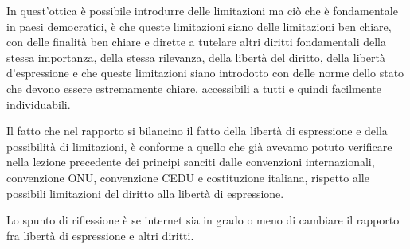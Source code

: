 In quest'ottica è possibile introdurre delle limitazioni ma ciò che è fondamentale in paesi democratici, è che queste limitazioni siano delle limitazioni ben chiare, con delle finalità ben chiare e dirette a tutelare altri diritti fondamentali della stessa importanza, della stessa rilevanza, della libertà del diritto, della libertà d'espressione e che queste limitazioni siano introdotto con delle norme dello stato che devono essere estremamente chiare, accessibili a tutti e quindi facilmente individuabili.\par
Il fatto che nel rapporto si bilancino il fatto della libertà di espressione e della possibilità di limitazioni, è conforme a quello che già avevamo potuto verificare nella lezione precedente dei principi sanciti dalle convenzioni internazionali, convenzione ONU, convenzione CEDU e costituzione italiana, rispetto alle possibili limitazioni del diritto alla libertà di espressione.\par
Lo spunto di riflessione è se internet sia in grado o meno di cambiare il rapporto fra libertà di espressione e altri diritti.
